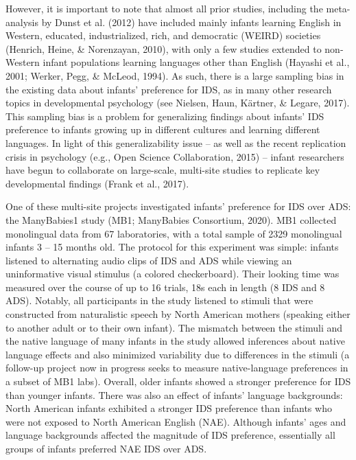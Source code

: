 \documentclass[
  ,man,floatsintext]{apa6}
\begin{document}
However, it is important to note that almost all prior studies, including the meta-analysis by Dunst et al. (2012) have included mainly infants learning English in Western, educated, industrialized, rich, and democratic (WEIRD) societies (Henrich, Heine, \& Norenzayan, 2010), with only a few studies extended to non-Western infant populations learning languages other than English (Hayashi et al., 2001; Werker, Pegg, \& McLeod, 1994). As such, there is a large sampling bias in the existing data about infants' preference for IDS, as in many other research topics in developmental psychology (see Nielsen, Haun, Kärtner, \& Legare, 2017). This sampling bias is a problem for generalizing findings about infants' IDS preference to infants growing up in different cultures and learning different languages. In light of this generalizability issue -- as well as the recent replication crisis in psychology (e.g., Open Science Collaboration, 2015) -- infant researchers have begun to collaborate on large-scale, multi-site studies to replicate key developmental findings (Frank et al., 2017).

One of these multi-site projects investigated infants' preference for IDS over ADS: the ManyBabies1 study (MB1; ManyBabies Consortium, 2020). MB1 collected monolingual data from 67 laboratories, with a total sample of 2329 monolingual infants 3 -- 15 months old. The protocol for this experiment was simple: infants listened to alternating audio clips of IDS and ADS while viewing an uninformative visual stimulus (a colored checkerboard). Their looking time was measured over the course of up to 16 trials, 18s each in length (8 IDS and 8 ADS). Notably, all participants in the study listened to stimuli that were constructed from naturalistic speech by North American mothers (speaking either to another adult or to their own infant). The mismatch between the stimuli and the native language of many infants in the study allowed inferences about native language effects and also minimized variability due to differences in the stimuli (a follow-up project now in progress seeks to measure native-language preferences in a subset of MB1 labs). Overall, older infants showed a stronger preference for IDS than younger infants. There was also an effect of infants' language backgrounds: North American infants exhibited a stronger IDS preference than infants who were not exposed to North American English (NAE). Although infants' ages and language backgrounds affected the magnitude of IDS preference, essentially all groups of infants preferred NAE IDS over ADS.
\end{document}
